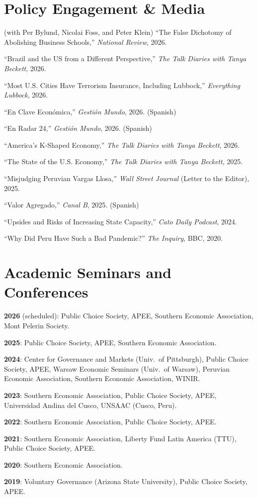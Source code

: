 \documentclass[11pt,letterpaper]{article}
\newcommand{\daterow}[2]{\noindent #1\hfill #2\par\smallskip}
\newenvironment{entries}
  {\begin{list}{}{\setlength{\leftmargin}{1.2em}\setlength{\itemindent}{-1.2em}\setlength{\itemsep}{5pt}\setlength{\topsep}{2pt}}}
  {\end{list}}
\begin{document}
\section{Policy Engagement \& Media}
\begin{entries}
\item[] (with Per Bylund, Nicolai Foss, and Peter Klein) ``The False Dichotomy of Abolishing Business Schools,'' \textit{National Review}, 2026.
\item[] ``Brazil and the US from a Different Perspective,'' \textit{The Talk Diaries with Tanya Beckett}, 2026.
\item[] ``Most U.S. Cities Have Terrorism Insurance, Including Lubbock,'' \textit{Everything Lubbock}, 2026.
\item[] ``En Clave Económica,'' \textit{Gestión Mundo}, 2026. (Spanish)
\item[] ``En Radar 24,'' \textit{Gestión Mundo}, 2026. (Spanish)
\item[] ``America's K-Shaped Economy,'' \textit{The Talk Diaries with Tanya Beckett}, 2026.
\item[] ``The State of the U.S. Economy,'' \textit{The Talk Diaries with Tanya Beckett}, 2025.
\item[] ``Misjudging Peruvian Vargas Llosa,'' \textit{Wall Street Journal} (Letter to the Editor), 2025.
\item[] ``Valor Agregado,'' \textit{Canal B}, 2025. (Spanish)
\item[] ``Upsides and Risks of Increasing State Capacity,'' \textit{Cato Daily Podcast}, 2024.
\item[] ``Why Did Peru Have Such a Bad Pandemic?'' \textit{The Inquiry}, BBC, 2020.
\end{entries}

\section{Academic Seminars and Conferences}
\daterow{\textbf{2026} (scheduled): Public Choice Society, APEE, Southern Economic Association, Mont Pelerin Society.}{}
\daterow{\textbf{2025}: Public Choice Society, APEE, Southern Economic Association.}{}
\daterow{\textbf{2024}: Center for Governance and Markets (Univ.\ of Pittsburgh), Public Choice Society, APEE, Warsaw Economic Seminars (Univ.\ of Warsaw), Peruvian Economic Association, Southern Economic Association, WINIR.}{}
\daterow{\textbf{2023}: Southern Economic Association, Public Choice Society, APEE, Universidad Andina del Cusco, UNSAAC (Cusco, Peru).}{}
\daterow{\textbf{2022}: Southern Economic Association, Public Choice Society, APEE.}{}
\daterow{\textbf{2021}: Southern Economic Association, Liberty Fund Latin America (TTU), Public Choice Society, APEE.}{}
\daterow{\textbf{2020}: Southern Economic Association.}{}
\daterow{\textbf{2019}: Voluntary Governance (Arizona State University), Public Choice Society, APEE.}{}
\end{document}
